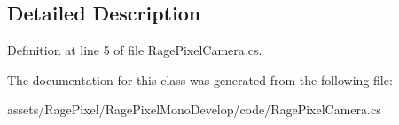 \subsection{Detailed Description}


Definition at line 5 of file Rage\-Pixel\-Camera.\-cs.



The documentation for this class was generated from the following file\-:\begin{DoxyCompactItemize}
\item 
assets/\-Rage\-Pixel/\-Rage\-Pixel\-Mono\-Develop/code/Rage\-Pixel\-Camera.\-cs\end{DoxyCompactItemize}
